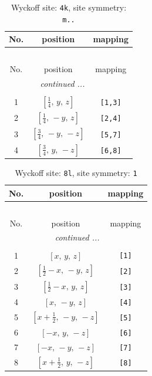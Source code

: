 \documentclass[fleqn,8pt]{jsarticle}
\begin{document}
\renewcommand{\arraystretch}{1.2}
\begin{longtable}{ccc}
\caption{Wyckoff site: {\tt 4k}, site symmetry: {\tt m..}}
 \\
 \hline \hline
No. & position & mapping \\ \hline \endfirsthead

\multicolumn{2}{l}{\tablename\ \thetable{}} \\
 \hline \hline
No. & position & mapping \\ \hline \endhead

 \hline \hline
\multicolumn{2}{r}{\footnotesize\it continued ...} \\ \endfoot

 \hline \hline
\multicolumn{2}{r}{} \\ \endlastfoot

1 & $\left[ \frac{1}{4},\, y,\, z \right]$ & {\tt [1,3]} \\ \hline
2 & $\left[ \frac{1}{4},\, - y,\, z \right]$ & {\tt [2,4]} \\ \hline
3 & $\left[ \frac{3}{4},\, - y,\, - z \right]$ & {\tt [5,7]} \\ \hline
4 & $\left[ \frac{3}{4},\, y,\, - z \right]$ & {\tt [6,8]} \\
\end{longtable}
\renewcommand{\arraystretch}{1.2}
\begin{longtable}{ccc}
\caption{Wyckoff site: {\tt 8l}, site symmetry: {\tt 1}}
 \\
 \hline \hline
No. & position & mapping \\ \hline \endfirsthead

\multicolumn{2}{l}{\tablename\ \thetable{}} \\
 \hline \hline
No. & position & mapping \\ \hline \endhead

 \hline \hline
\multicolumn{2}{r}{\footnotesize\it continued ...} \\ \endfoot

 \hline \hline
\multicolumn{2}{r}{} \\ \endlastfoot

1 & $\left[ x,\, y,\, z \right]$ & {\tt [1]} \\ \hline
2 & $\left[ \frac{1}{2} - x,\, - y,\, z \right]$ & {\tt [2]} \\ \hline
3 & $\left[ \frac{1}{2} - x,\, y,\, z \right]$ & {\tt [3]} \\ \hline
4 & $\left[ x,\, - y,\, z \right]$ & {\tt [4]} \\ \hline
5 & $\left[ x + \frac{1}{2},\, - y,\, - z \right]$ & {\tt [5]} \\ \hline
6 & $\left[ - x,\, y,\, - z \right]$ & {\tt [6]} \\ \hline
7 & $\left[ - x,\, - y,\, - z \right]$ & {\tt [7]} \\ \hline
8 & $\left[ x + \frac{1}{2},\, y,\, - z \right]$ & {\tt [8]} \\
\end{longtable}
\end{document}
